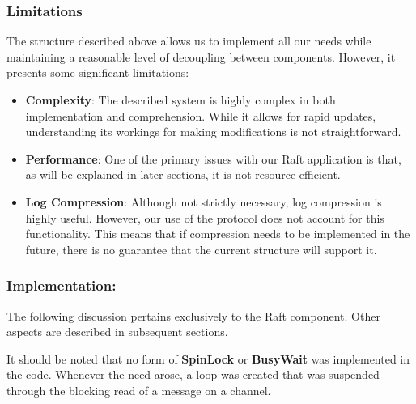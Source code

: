 \subsubsection{Limitations}
The structure described above allows us to implement all our needs while maintaining a 
reasonable level of decoupling between components. However, it presents some significant limitations:
\begin{itemize}
    \item \textbf{Complexity}: The described system is highly complex in both implementation 
      and comprehension. While it allows for rapid updates, understanding its workings 
      for making modifications is not straightforward.
    \item \textbf{Performance}: One of the primary issues with our Raft application is that, 
      as will be explained in later sections, it is not resource-efficient.
    \item \textbf{Log Compression}: Although not strictly necessary, log compression is 
      highly useful. However, our use of the protocol does not account for this functionality. 
      This means that if compression needs to be implemented in the future, there is no 
      guarantee that the current structure will support it.
\end{itemize}

\subsubsection{Implementation:\\}
The following discussion pertains exclusively to the Raft component. Other aspects are 
described in subsequent sections.

It should be noted that no form of \textbf{SpinLock} or \textbf{BusyWait} was implemented 
in the code. Whenever the need arose, a loop was created that was suspended through the 
blocking read of a message on a channel.

